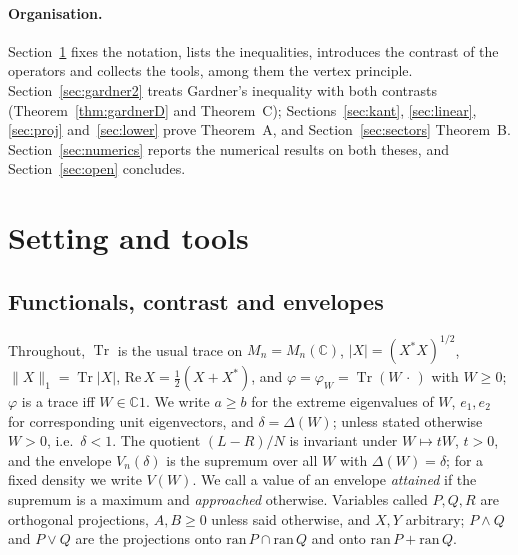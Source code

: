 \documentclass[11pt]{article}
\DeclareMathOperator{\Tr}{Tr}
\newcommand{\C}{\mathbb{C}}
\renewcommand{\Re}{\mathrm{Re}\,}
\theoremstyle{plain}
\theoremstyle{definition}
\theoremstyle{remark}
\begin{document}
\paragraph{Organisation.} Section~\ref{sec:setting} fixes the notation, lists the inequalities, introduces the
contrast of the operators and collects the tools, among them the vertex principle. Section~\ref{sec:gardner2} treats
Gardner's inequality with both contrasts (Theorem~\ref{thm:gardnerD} and Theorem~C); Sections~\ref{sec:kant},
\ref{sec:linear}, \ref{sec:proj} and~\ref{sec:lower} prove Theorem~A, and Section~\ref{sec:sectors} Theorem~B.
Section~\ref{sec:numerics} reports the numerical results on both theses, and Section~\ref{sec:open} concludes.

\section{Setting and tools}\label{sec:setting}

\subsection{Functionals, contrast and envelopes}
Throughout, $\Tr$ is the usual trace on $M_n=M_n(\C)$, $|X|=(X^*X)^{1/2}$, $\|X\|_1=\Tr|X|$, $\Re X=\frac12(X+X^*)$,
and $\varphi=\varphi_W=\Tr(W\,\cdot\,)$ with $W\ge0$; $\varphi$ is a trace iff $W\in\C1$. We write $a\ge b$ for the
extreme eigenvalues of $W$, $e_1,e_2$ for corresponding unit eigenvectors, and $\delta=\Delta(W)$; unless stated
otherwise $W>0$, i.e.\ $\delta<1$. The quotient $(L-R)/N$ is invariant under $W\mapsto tW$, $t>0$, and the envelope
$V_n(\delta)$ is the supremum over all $W$ with $\Delta(W)=\delta$; for a fixed density we write $V(W)$. We call a
value of an envelope \emph{attained} if the supremum is a maximum and \emph{approached} otherwise. Variables called $P,Q,R$
are orthogonal projections, $A,B\ge0$ unless said otherwise, and $X,Y$ arbitrary; $P\wedge Q$ and $P\vee Q$ are the
projections onto $\mathrm{ran}\,P\cap\mathrm{ran}\,Q$ and onto $\mathrm{ran}\,P+\mathrm{ran}\,Q$.
\end{document}
